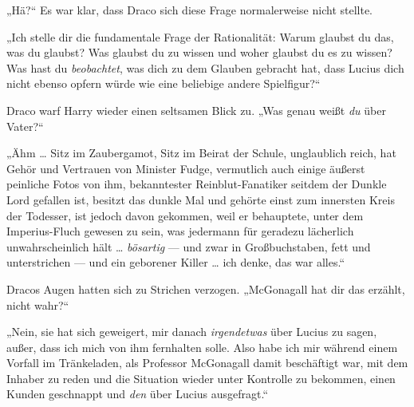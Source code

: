 „Hä?“ Es war klar, dass Draco sich diese Frage normalerweise nicht stellte.

„Ich stelle dir die fundamentale Frage der Rationalität: Warum glaubst du das, was du glaubst? Was glaubst du zu wissen und woher glaubst du es zu wissen? Was hast du \emph{beobachtet}, was dich zu dem Glauben gebracht hat, dass Lucius dich nicht ebenso opfern würde wie eine beliebige andere Spielfigur?“

Draco warf Harry wieder einen seltsamen Blick zu.
„Was genau weißt \emph{du} über Vater?“

„Ähm … Sitz im Zaubergamot, Sitz im Beirat der Schule, unglaublich reich, hat Gehör und Vertrauen von Minister Fudge, vermutlich auch einige äußerst peinliche Fotos von ihm, bekanntester Reinblut-Fanatiker seitdem der Dunkle Lord gefallen ist, besitzt das dunkle Mal und gehörte einst zum innersten Kreis der Todesser, ist jedoch davon gekommen, weil er behauptete, unter dem Imperius-Fluch gewesen zu sein, was jedermann für geradezu lächerlich unwahrscheinlich hält … \emph{bösartig} — und zwar in Großbuchstaben, fett und unterstrichen — und ein geborener Killer … ich denke, das war alles.“

Dracos Augen hatten sich zu Strichen verzogen.
„McGonagall hat dir das erzählt, nicht wahr?“

„Nein, sie hat sich geweigert, mir danach \emph{irgendetwas} über Lucius zu sagen, außer, dass ich mich von ihm fernhalten solle. Also habe ich mir während einem Vorfall im Tränkeladen, als Professor McGonagall damit beschäftigt war, mit dem Inhaber zu reden und die Situation wieder unter Kontrolle zu bekommen, einen Kunden geschnappt und \emph{den} über Lucius ausgefragt.“

